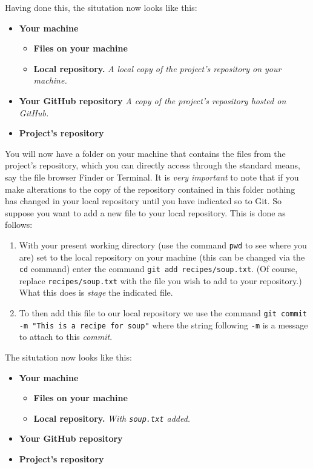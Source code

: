 \documentclass[11pt]{amsart}
\def\code#1{\texttt{#1}}
\begin{document}
Having done this, the situtation now looks like this: 
\begin{itemize}
    \item \textbf{Your machine}
    \begin{itemize}
        \item \textbf{Files on your machine}
        \item \textbf{Local repository.} \emph{A local copy of the project's repository on your machine.} 
    \end{itemize}
    \item \textbf{Your GitHub repository} \emph{A copy of the project's repository hosted on GitHub.}
    \item \textbf{Project's repository}
\end{itemize}

You will now have a folder on your machine that contains the files from the project's repository, which you can directly access through the standard means, say the file browser Finder or Terminal. It is \emph{very important} to note that if you make alterations to the copy of the repository contained in this folder nothing has changed in your local repository until you have indicated so to Git. So suppose you want to add a new file to your local repository. This is done as follows: 
\begin{enumerate}
    \item With your present working directory (use the command \code{pwd} to see where you are) set to the local repository on your machine (this can be changed via the \code{cd} command) enter the command \code{git add recipes/soup.txt}. (Of course, replace \code{recipes/soup.txt} with the file you wish to add to your repository.) 
        \subitem What this does is \emph{stage} the indicated file. 
    \item To then add this file to our local repository we use the command \code{git commit -m "This is a recipe for soup"} where the string following \code{-m} is a message to attach to this \emph{commit}.
\end{enumerate}

The situtation now looks like this: 
\begin{itemize}
    \item \textbf{Your machine}
    \begin{itemize}
        \item \textbf{Files on your machine}
        \item \textbf{Local repository.} \emph{With \code{soup.txt} added.}
    \end{itemize}
    \item \textbf{Your GitHub repository}
    \item \textbf{Project's repository}
\end{itemize}
\end{document}
